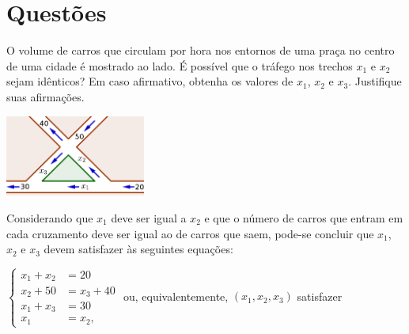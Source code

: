 \documentclass[12pt,a4paper]{article}
\begin{document}
\section*{Questões}
\begin{ExerciseList}
\Exercise[title={2,5}]
\begin{minipage}[t]{0.59\textwidth}
O volume de carros que circulam por hora nos entornos de uma praça no centro de uma cidade é mostrado ao lado. É possível que o tráfego nos trechos $x_1$ e $x_2$ sejam idênticos? Em caso afirmativo, obtenha os valores de $x_1$, $x_2$ e $x_3$. Justifique suas afirmações.
\end{minipage}
\hfill
\begin{minipage}[t]{0.3\textwidth}
\raggedleft\vspace{-0.25cm}
\vfill
\includegraphics[width=4.6cm]{img/prova-1-pro-quadras}
\end{minipage}
\Answer Considerando que $x_1$ deve ser igual a $x_2$ e que o número de carros que entram em cada cruzamento deve ser igual ao de carros que saem, pode-se concluir que $x_1$, $x_2$ e $x_3$ devem satisfazer às seguintes equações:

$\begin{cases}
x_1 + x_2 & = 20\\
x_2 +  50 & = x_3 + 40\\
x_1 + x_3 & = 30\\
x_1 & = x_2,
\end{cases}$
ou, equivalentemente, $(x_1,x_2,x_3)$ satisfazer


\end{ExerciseList}
\end{document}
